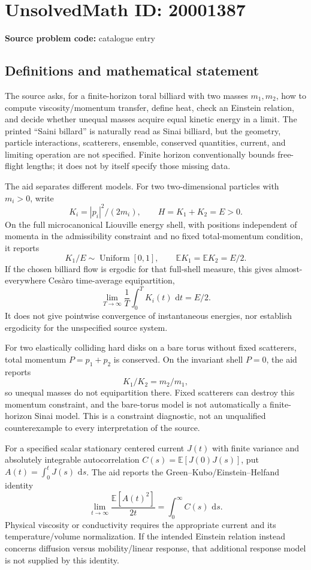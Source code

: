 \documentclass[11pt]{article}
\newcommand{\E}{\mathbb{E}}
\newcommand{\dd}{\,\mathrm{d}}
\begin{document}
\section*{UnsolvedMath ID: 20001387}
\textbf{Source problem code:} catalogue entry
\subsection{Definitions and mathematical statement}
The source asks, for a finite-horizon toral billiard with two masses \(m_1,m_2\), how to compute viscosity/momentum transfer, define heat, check an Einstein relation, and decide whether unequal masses acquire equal kinetic energy in a limit. The printed ``Saini billard'' is naturally read as Sinai billiard, but the geometry, particle interactions, scatterers, ensemble, conserved quantities, current, and limiting operation are not specified. Finite horizon conventionally bounds free-flight lengths; it does not by itself specify those missing data.

The aid separates different models. For two two-dimensional particles with \(m_i>0\), write
\[
 K_i=|p_i|^2/(2m_i),\qquad H=K_1+K_2=E>0.
\]
On the full microcanonical Liouville energy shell, with positions independent of momenta in the admissibility constraint and no fixed total-momentum condition, it reports
\[
 K_1/E\sim\operatorname{Uniform}[0,1],\qquad
 \E K_1=\E K_2=E/2.
\]
If the chosen billiard flow is ergodic for that full-shell measure, this gives almost-everywhere Ces\`aro time-average equipartition,
\[
 \lim_{T\to\infty}\frac1T\int_0^TK_i(t)\,\dd t=E/2.
\]
It does not give pointwise convergence of instantaneous energies, nor establish ergodicity for the unspecified source system.

For two elastically colliding hard disks on a bare torus without fixed scatterers, total momentum \(P=p_1+p_2\) is conserved. On the invariant shell \(P=0\), the aid reports
\[
 K_1/K_2=m_2/m_1,
\]
so unequal masses do not equipartition there. Fixed scatterers can destroy this momentum constraint, and the bare-torus model is not automatically a finite-horizon Sinai model. This is a constraint diagnostic, not an unqualified counterexample to every interpretation of the source.

For a specified scalar stationary centered current \(J(t)\) with finite variance and absolutely integrable autocorrelation \(C(s)=\E[J(0)J(s)]\), put \(A(t)=\int_0^tJ(s)\,\dd s\). The aid reports the Green--Kubo/Einstein--Helfand identity
\[
 \lim_{t\to\infty}\frac{\E[A(t)^2]}{2t}
 =\int_0^\infty C(s)\,\dd s.
\]
Physical viscosity or conductivity requires the appropriate current and its temperature/volume normalization. If the intended Einstein relation instead concerns diffusion versus mobility/linear response, that additional response model is not supplied by this identity.
\end{document}
